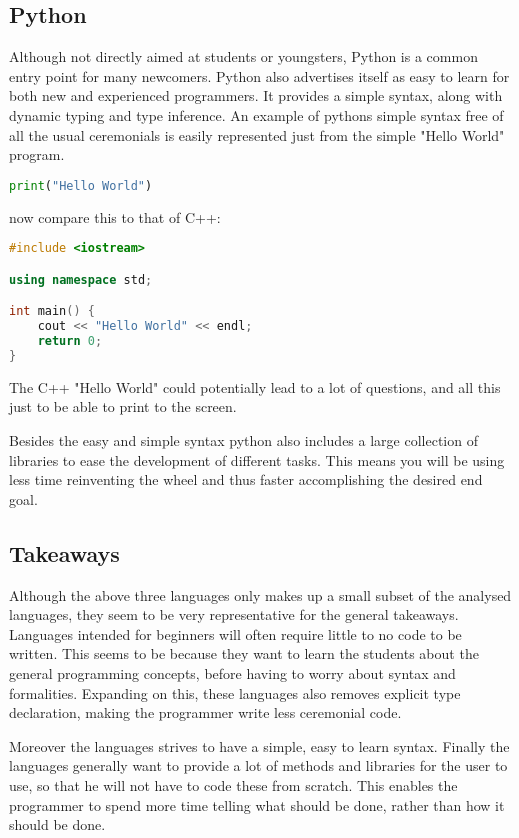 \subsection{Python}
Although not directly aimed at students or youngsters, Python is a common entry point for many newcomers. 
Python also advertises itself as easy to learn for both new and experienced programmers. 
It provides a simple syntax, along with dynamic typing and type inference.\cite{PythonWebsite}
An example of pythons simple syntax free of all the usual ceremonials is easily represented just from the simple "Hello World" program.

\begin{lstlisting}[language=Python,label=lis:PythonHelloWorld,caption=Hello World in python]
print("Hello World")
\end{lstlisting}

now compare this to that of C++:

\begin{lstlisting}[language=C++,label=lis:C++HelloWorld,caption=Hello World in C++]
#include <iostream>

using namespace std;

int main() {
	cout << "Hello World" << endl;
	return 0;
}
\end{lstlisting}

The C++ "Hello World" could potentially lead to a lot of questions, and all this just to be able to print to the screen.

Besides the easy and simple syntax python also includes a large collection of libraries to ease the development of different tasks.\cite{PythonLibraries}
This means you will be using less time reinventing the wheel and thus faster accomplishing the desired end goal.\cite{PythonXKCD}

\subsection{Takeaways}
Although the above three languages only makes up a small subset of the analysed languages, they seem to be very representative for the general takeaways. 
Languages intended for beginners will often require little to no code to be written. 
This seems to be because they want to learn the students about the general programming concepts, before having to worry about syntax and formalities. 
Expanding on this, these languages also removes explicit type declaration, making the programmer write less ceremonial code.

Moreover the languages strives to have a simple, easy to learn syntax. 
Finally the languages generally want to provide a lot of methods and libraries for the user to use, so that he will not have to code these from scratch. 
This enables the programmer to spend more time telling what should be done, rather than how it should be done.
